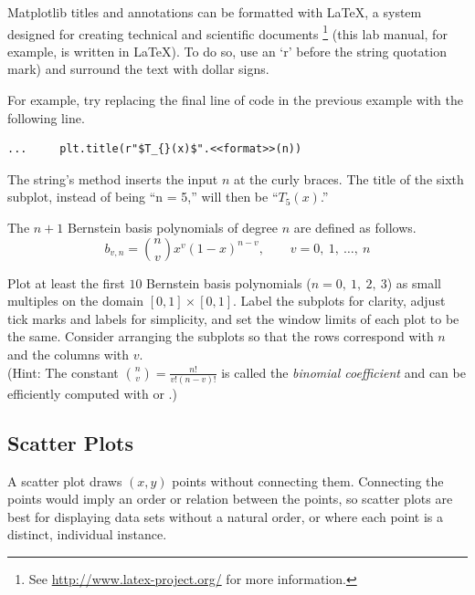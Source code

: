 \begin{info} %
Matplotlib titles and annotations can be formatted with \LaTeX, a system designed for creating technical and scientific documents%
\footnote{See \url{http://www.latex-project.org/} for more information.}
(this lab manual, for example, is written in \LaTeX).
To do so, use an `r' before the string quotation mark) and surround the text with dollar signs.

For example, try replacing the final line of code in the previous example with the following line.

\begin{lstlisting}
...     plt.title(r"$T_{}(x)$".<<format>>(n))
\end{lstlisting}

The string's  method inserts the input $n$ at the curly braces.
The title of the sixth subplot, instead of being ``n = 5,'' will then be ``$T_5(x)$.''
\end{info}


\begin{problem} %
The $n+1$ Bernstein basis polynomials of degree $n$ are defined as follows.
\[b_{v,n} = {{n} \choose {v}} x^v (1-x)^{n-v},\qquad v = 0,\ 1,\ \ldots,\ n\]

Plot at least the first $10$ Bernstein basis polynomials ($n = 0,\ 1,\ 2,\ 3$) as small multiples on the domain $[0,1] \times [0,1]$.
Label the subplots for clarity, adjust tick marks and labels for simplicity, and set the window limits of each plot to be the same.
Consider arranging the subplots so that the rows correspond with $n$ and the columns with $v$.
\\(Hint: The constant ${{n} \choose {v}} = \frac{n!}{v!(n-v)!}$ is called the \emph{binomial coefficient} and can be efficiently computed with  or .)
\end{problem}

\subsection*{Scatter Plots} %

A scatter plot draws $(x,y)$ points without connecting them.
Connecting the points would imply an order or relation between the points, so scatter plots are best for displaying data sets without a natural order, or where each point is a distinct, individual instance.

